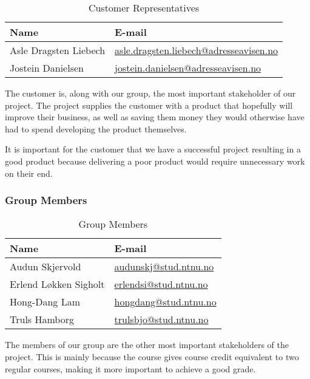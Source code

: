 \begin{table}[H]
\begin{tabular}{|l|l|}
\hline
\textbf{Name} & \textbf{E-mail} \\
\hline
Asle Dragsten Liebech & \href{mailto://asle.dragsten.liebech@adresseavisen.no}{asle.dragsten.liebech@adresseavisen.no}\\
Jostein Danielsen & \href{mailto://jostein.danielsen@adresseavisen.no}{jostein.danielsen@adresseavisen.no}\\
\hline
\end{tabular}
\caption{Customer Representatives}
\end{table}

The customer is, along with our group, the most important stakeholder of our project. The project supplies the customer with a product that hopefully will improve their business, as well as saving them money they would otherwise have had to spend developing the product themselves.

It is important for the customer that we have a successful project resulting in a good product because delivering a poor product would require unnecessary work on their end.
\subsubsection{Group Members}
\begin{table}[H]
\begin{tabular}{|p{5cm}|p{6cm}|}
\hline
\textbf{Name} & \textbf{E-mail} \\
\hline
Audun Skjervold & \href{mailto://audunskj@stud.ntnu.no}{audunskj@stud.ntnu.no}\\
Erlend Løkken Sigholt & \href{mailto://erlendsi@stud.ntnu.no}{erlendsi@stud.ntnu.no}\\
Hong-Dang Lam & \href{mailto://hongdang@stud.ntnu.no}{hongdang@stud.ntnu.no}\\
Truls Hamborg & \href{mailto://trulsbjo@stud.ntnu.no}{trulsbjo@stud.ntnu.no}\\
\hline
\end{tabular}
\caption{Group Members}
\end{table}

The members of our group are the other most important stakeholders of the project. This is mainly because the course gives course credit equivalent to two regular courses, making it more important to achieve a good grade.


